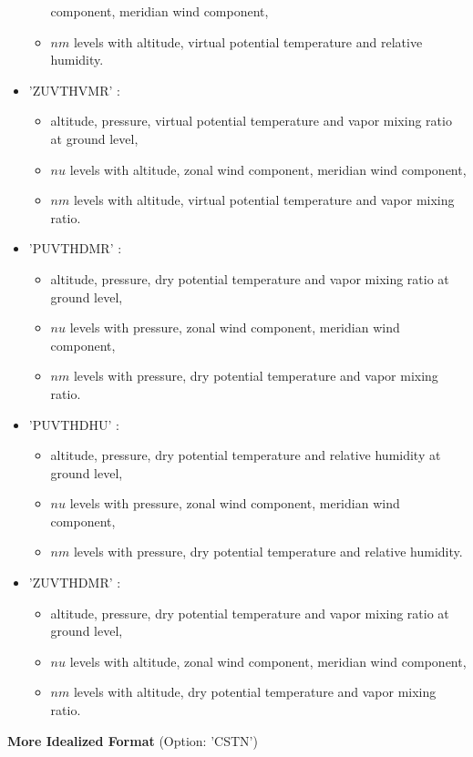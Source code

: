 \begin{itemize}
\begin{itemize}
component, meridian wind component, \item  $nm$ levels with altitude, virtual potential temperature
and relative humidity.\end{itemize}
\item 'ZUVTHVMR'  :  \begin{itemize} \item  altitude, pressure, virtual potential temperature
and vapor mixing ratio at ground level, \item  $nu$ levels with altitude, zonal wind
component, meridian wind component, \item  $nm$ levels with   altitude, virtual potential temperature
and vapor mixing ratio. \end{itemize}
\item 'PUVTHDMR'  : \begin{itemize} \item   altitude, pressure, dry potential temperature
and vapor mixing ratio at ground level, \item  $nu$ levels with pressure, zonal wind
component, meridian wind component, \item  $nm$ levels with pressure,
dry potential temperature and vapor mixing ratio.\end{itemize}
\item 'PUVTHDHU'  : \begin{itemize} \item altitude, pressure, dry potential temperature
and relative humidity at ground level, \item  $nu$ levels with pressure, zonal wind
component, meridian wind component, \item  $nm$ levels with pressure,
dry potential temperature and relative humidity.\end{itemize}
\item 'ZUVTHDMR'  : \begin{itemize} \item   altitude, pressure, dry potential temperature
and vapor mixing ratio at ground level, \item  $nu$ levels with  altitude, zonal wind
component, meridian wind component, \item  $nm$ levels with  altitude,
dry potential temperature and vapor mixing ratio.\end{itemize}
\end{itemize}

{\bf More Idealized Format} (Option: 'CSTN')

